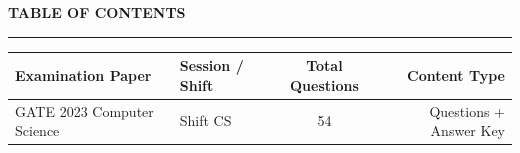 \documentclass[a4paper,10pt,twoside]{article}
\begin{document}
\newpage

\begin{center}
    {\Large\textbf{TABLE OF CONTENTS}}\\[0.4em]
    \rule{0.5\textwidth}{0.6pt}
\end{center}
\vspace{1em}

\noindent\begin{tabularx}{\linewidth}{|X|l|c|r|}
\hline
\textbf{Examination Paper} & \textbf{Session / Shift} & \textbf{Total Questions} & \textbf{Content Type} \\
\hline

GATE 2023 Computer Science & Shift CS & 54 & Questions + Answer Key \\ \hline
\end{tabularx}

\vspace{1.5em}

\newpage
\end{document}

